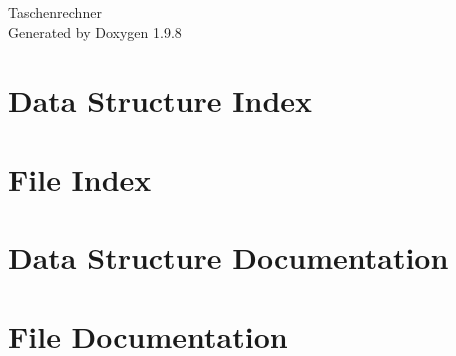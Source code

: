 \documentclass[twoside]{book}
\newcommand{\+}{\discretionary{\mbox{\scriptsize$\hookleftarrow$}}{}{}}
\newcommand{\clearemptydoublepage}{%
    \newpage{\pagestyle{empty}\cleardoublepage}%
  }
\begin{document}
  \raggedbottom
    \hypersetup{pageanchor=false,
                bookmarksnumbered=true,
                pdfencoding=unicode
               }
  \begin{titlepage}
  \vspace*{7cm}
  \begin{center}%
  {\Large Taschenrechner}\\
  \vspace*{1cm}
  {\large Generated by Doxygen 1.9.8}\\
  \end{center}
  \end{titlepage}
  \clearemptydoublepage
  \tableofcontents
  \clearemptydoublepage
  \hypersetup{pageanchor=true}
\chapter{Data Structure Index}

\chapter{File Index}

\chapter{Data Structure Documentation}

\chapter{File Documentation}












  \backmatter
  \newpage
  \clearemptydoublepage
  \printindex
\end{document}
